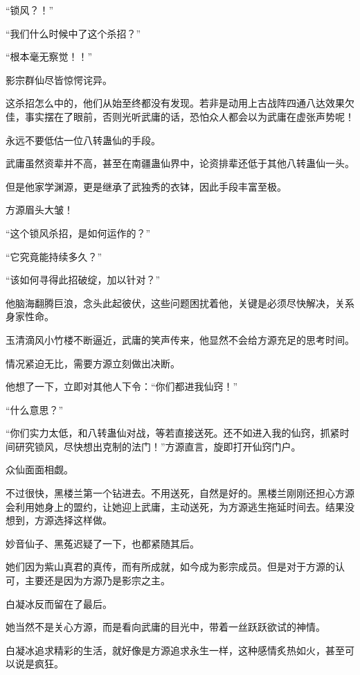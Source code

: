 
\begin{this_body}

“锁风？！”

“我们什么时候中了这个杀招？”

“根本毫无察觉！！”

影宗群仙尽皆惊愕诧异。

这杀招怎么中的，他们从始至终都没有发现。若非是动用上古战阵四通八达效果欠佳，事实摆在了眼前，否则光听武庸的话，恐怕众人都会以为武庸在虚张声势呢！

永远不要低估一位八转蛊仙的手段。

武庸虽然资辈并不高，甚至在南疆蛊仙界中，论资排辈还低于其他八转蛊仙一头。

但是他家学渊源，更是继承了武独秀的衣钵，因此手段丰富至极。

方源眉头大皱！

“这个锁风杀招，是如何运作的？”

“它究竟能持续多久？”

“该如何寻得此招破绽，加以针对？”

他脑海翻腾巨浪，念头此起彼伏，这些问题困扰着他，关键是必须尽快解决，关系身家性命。

玉清滴风小竹楼不断逼近，武庸的笑声传来，他显然不会给方源充足的思考时间。

情况紧迫无比，需要方源立刻做出决断。

他想了一下，立即对其他人下令：“你们都进我仙窍！”

“什么意思？”

“你们实力太低，和八转蛊仙对战，等若直接送死。还不如进入我的仙窍，抓紧时间研究锁风，尽快想出克制的法门！”方源直言，旋即打开仙窍门户。

众仙面面相觑。

不过很快，黑楼兰第一个钻进去。不用送死，自然是好的。黑楼兰刚刚还担心方源会利用她身上的盟约，让她迎上武庸，主动送死，为方源逃生拖延时间去。结果没想到，方源选择这样做。

妙音仙子、黑菟迟疑了一下，也都紧随其后。

她们因为紫山真君的真传，而有所成就，如今成为影宗成员。但是对于方源的认可，主要还是因为方源乃是影宗之主。

白凝冰反而留在了最后。

她当然不是关心方源，而是看向武庸的目光中，带着一丝跃跃欲试的神情。

白凝冰追求精彩的生活，就好像是方源追求永生一样，这种感情炙热如火，甚至可以说是疯狂。


\end{this_body}
